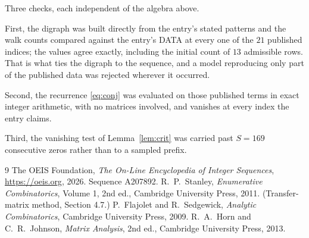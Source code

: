\documentclass[11pt,a4paper]{article}
\theoremstyle{plain}
\theoremstyle{definition}
\begin{document}
Three checks, each independent of the algebra above.

First, the digraph was built directly from the entry's stated patterns and the walk counts
compared against the entry's DATA at every one of the $21$ published indices; the
values agree exactly, including the initial count of $13$ admissible rows. That is
what ties the digraph to the sequence, and a model reproducing only part of the published
data was rejected wherever it occurred.

Second, the recurrence \eqref{eq:conj} was evaluated on those published terms in exact
integer arithmetic, with no matrices involved, and vanishes at every index the entry claims.

Third, the vanishing test of Lemma~\ref{lem:crit} was carried past $S=169$ consecutive
zeros rather than to a sampled prefix.

\begin{thebibliography}{9}
 The OEIS Foundation, \emph{The On-Line Encyclopedia of Integer
Sequences}, \url{https://oeis.org}, 2026. Sequence A207892.
 R.~P.~Stanley, \emph{Enumerative Combinatorics}, Volume 1, 2nd ed.,
Cambridge University Press, 2011. (Transfer-matrix method, Section 4.7.)
 P.~Flajolet and R.~Sedgewick, \emph{Analytic Combinatorics}, Cambridge
University Press, 2009.
 R.~A.~Horn and C.~R.~Johnson, \emph{Matrix Analysis}, 2nd ed., Cambridge
University Press, 2013.
\end{thebibliography}
\end{document}
